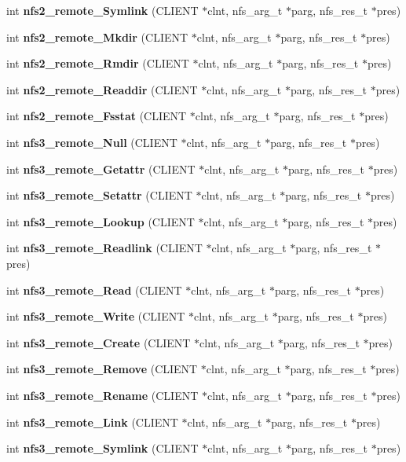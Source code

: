 \begin{DoxyCompactItemize}
int {\bf nfs2\_\-remote\_\-Symlink} (CLIENT $\ast$clnt, nfs\_\-arg\_\-t $\ast$parg, nfs\_\-res\_\-t $\ast$pres)
\item 
int {\bf nfs2\_\-remote\_\-Mkdir} (CLIENT $\ast$clnt, nfs\_\-arg\_\-t $\ast$parg, nfs\_\-res\_\-t $\ast$pres)
\item 
int {\bf nfs2\_\-remote\_\-Rmdir} (CLIENT $\ast$clnt, nfs\_\-arg\_\-t $\ast$parg, nfs\_\-res\_\-t $\ast$pres)
\item 
int {\bf nfs2\_\-remote\_\-Readdir} (CLIENT $\ast$clnt, nfs\_\-arg\_\-t $\ast$parg, nfs\_\-res\_\-t $\ast$pres)
\item 
int {\bf nfs2\_\-remote\_\-Fsstat} (CLIENT $\ast$clnt, nfs\_\-arg\_\-t $\ast$parg, nfs\_\-res\_\-t $\ast$pres)
\item 
int {\bf nfs3\_\-remote\_\-Null} (CLIENT $\ast$clnt, nfs\_\-arg\_\-t $\ast$parg, nfs\_\-res\_\-t $\ast$pres)
\item 
int {\bf nfs3\_\-remote\_\-Getattr} (CLIENT $\ast$clnt, nfs\_\-arg\_\-t $\ast$parg, nfs\_\-res\_\-t $\ast$pres)
\item 
int {\bf nfs3\_\-remote\_\-Setattr} (CLIENT $\ast$clnt, nfs\_\-arg\_\-t $\ast$parg, nfs\_\-res\_\-t $\ast$pres)
\item 
int {\bf nfs3\_\-remote\_\-Lookup} (CLIENT $\ast$clnt, nfs\_\-arg\_\-t $\ast$parg, nfs\_\-res\_\-t $\ast$pres)
\item 
int {\bf nfs3\_\-remote\_\-Readlink} (CLIENT $\ast$clnt, nfs\_\-arg\_\-t $\ast$parg, nfs\_\-res\_\-t $\ast$pres)
\item 
int {\bf nfs3\_\-remote\_\-Read} (CLIENT $\ast$clnt, nfs\_\-arg\_\-t $\ast$parg, nfs\_\-res\_\-t $\ast$pres)
\item 
int {\bf nfs3\_\-remote\_\-Write} (CLIENT $\ast$clnt, nfs\_\-arg\_\-t $\ast$parg, nfs\_\-res\_\-t $\ast$pres)
\item 
int {\bf nfs3\_\-remote\_\-Create} (CLIENT $\ast$clnt, nfs\_\-arg\_\-t $\ast$parg, nfs\_\-res\_\-t $\ast$pres)
\item 
int {\bf nfs3\_\-remote\_\-Remove} (CLIENT $\ast$clnt, nfs\_\-arg\_\-t $\ast$parg, nfs\_\-res\_\-t $\ast$pres)
\item 
int {\bf nfs3\_\-remote\_\-Rename} (CLIENT $\ast$clnt, nfs\_\-arg\_\-t $\ast$parg, nfs\_\-res\_\-t $\ast$pres)
\item 
int {\bf nfs3\_\-remote\_\-Link} (CLIENT $\ast$clnt, nfs\_\-arg\_\-t $\ast$parg, nfs\_\-res\_\-t $\ast$pres)
\item 
int {\bf nfs3\_\-remote\_\-Symlink} (CLIENT $\ast$clnt, nfs\_\-arg\_\-t $\ast$parg, nfs\_\-res\_\-t $\ast$pres)

\end{DoxyCompactItemize}
